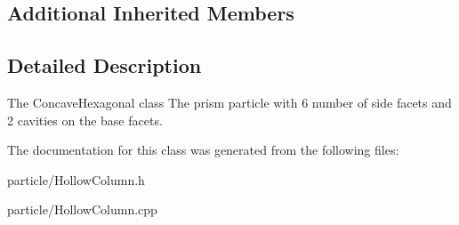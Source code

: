 \subsection*{Additional Inherited Members}


\subsection{Detailed Description}
The Concave\+Hexagonal class The prism particle with 6 number of side facets and 2 cavities on the base facets. 

The documentation for this class was generated from the following files\+:\begin{DoxyCompactItemize}
\item 
particle/Hollow\+Column.\+h\item 
particle/Hollow\+Column.\+cpp\end{DoxyCompactItemize}
